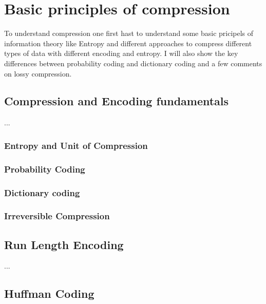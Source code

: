 
\chapter{Basic principles of compression}
\label{ch:Basic principles of compression}

To understand compression one first hast to understand some basic pricipels of information theory like Entropy and different approaches to compress different types of data with different encoding and entropy. I will also show the key differences between probability coding and dictionary coding and a few comments on lossy compression.


\section{Compression and Encoding fundamentals}
\label{ch:Basic principles of compression:sec:Compression}

...
\subsection{Entropy and Unit of Compression}
\subsection{Probability Coding}
\subsection{Dictionary coding}
\subsection{Irreversible Compression}


\section{Run Length Encoding}
\label{ch:Grundlagen:sec:Run Length Encoding}

...

\section{Huffman Coding}
\label{ch:Grundlagen:sec:Huffman Coding}

